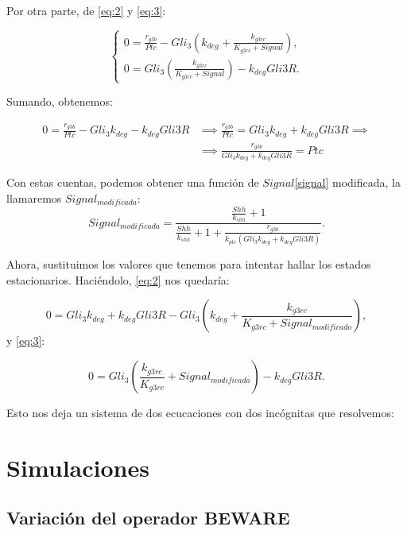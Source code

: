 Por otra parte, de \ref{eq:2} y \ref{eq:3}:



$$\begin{cases} 0 = \frac{r_{g3b}}{Ptc}-Gli_3\left(k_{deg}+\frac{k_{g3rc}}{K_{g3rc}+Signal}\right), \\0=Gli_3\left(\frac{k_{g3rc}}{K_{g3rc}+Signal}\right)-k_{deg}Gli3R. \end{cases}$$

Sumando, obtenemos:

\begin{equation}
\begin{split}
0=\frac{r_{g3b}}{Ptc}-Gli_3k_{deg}-k_{deg}Gli3R & \implies \frac{r_{g3b}}{Ptc}=Gli_3k_{deg}+k_{deg}Gli3R\implies
 \\
& \implies \frac{r_{g3b}}{Gli_3k_{deg}+k_{deg}Gli3R}=Ptc
\end{split}
\end{equation}

Con estas cuentas, podemos obtener una función de $Signal$\ref{signal} modificada, la llamaremos $Signal_{modificada}$:
 \begin{equation}
 Signal_{modificada}=\frac{\frac{Shh}{k_{shh}} + 1}{\frac{Shh}{k_{shh}} + 1 + \frac{r_{g3b}}{k_{ptc}(Gli_3k_{deg}+k_{deg}Gli3R)}}.
 \end{equation}
 
Ahora, sustituimos los valores que tenemos para intentar hallar los estados estacionarios. Haciéndolo, \ref{eq:2} nos quedaría:

\begin{equation}
0 = Gli_3k_{deg}+k_{deg}Gli3R-Gli_3\left(k_{deg}+\frac{k_{g3rc}}{K_{g3rc}+Signal_{modificado}}\right),
\label{eq:2-modified}
\end{equation}
y \ref{eq:3}:

\begin{equation}
0=Gli_3\left(\frac{k_{g3rc}}{K_{g3rc}}+Signal_{modificada}\right)-k_{deg}Gli3R.
	\label{eq:3-modified}
\end{equation}

Esto nos deja un sistema de dos ecucaciones con dos incógnitas que resolvemos:




\section{Simulaciones}

\subsection{Variación del operador BEWARE}

